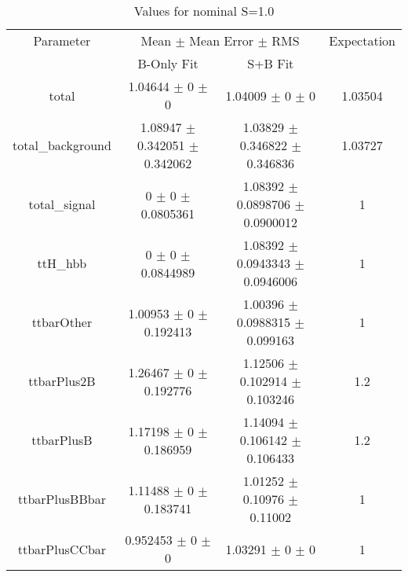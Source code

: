 \begin{table}
\centering
\caption{Values for nominal S=1.0}
\begin{tabular}{cccc}
\toprule
Parameter & \multicolumn{2}{c}{Mean $\pm$ Mean Error $\pm$ RMS} & Expectation\\
 & B-Only Fit & S+B Fit & \\
\midrule
total & \num{1.04644} $\pm$ \num{0} $\pm$ \num{0} & \num{1.04009} $\pm$ \num{0} $\pm$ \num{0} & \num{1.03504}\\
total\_background & \num{1.08947} $\pm$ \num{0.342051} $\pm$ \num{0.342062} & \num{1.03829} $\pm$ \num{0.346822} $\pm$ \num{0.346836} & \num{1.03727}\\
total\_signal & \num{0} $\pm$ \num{0} $\pm$ \num{0.0805361} & \num{1.08392} $\pm$ \num{0.0898706} $\pm$ \num{0.0900012} & \num{1}\\
ttH\_hbb & \num{0} $\pm$ \num{0} $\pm$ \num{0.0844989} & \num{1.08392} $\pm$ \num{0.0943343} $\pm$ \num{0.0946006} & \num{1}\\
ttbarOther & \num{1.00953} $\pm$ \num{0} $\pm$ \num{0.192413} & \num{1.00396} $\pm$ \num{0.0988315} $\pm$ \num{0.099163} & \num{1}\\
ttbarPlus2B & \num{1.26467} $\pm$ \num{0} $\pm$ \num{0.192776} & \num{1.12506} $\pm$ \num{0.102914} $\pm$ \num{0.103246} & \num{1.2}\\
ttbarPlusB & \num{1.17198} $\pm$ \num{0} $\pm$ \num{0.186959} & \num{1.14094} $\pm$ \num{0.106142} $\pm$ \num{0.106433} & \num{1.2}\\
ttbarPlusBBbar & \num{1.11488} $\pm$ \num{0} $\pm$ \num{0.183741} & \num{1.01252} $\pm$ \num{0.10976} $\pm$ \num{0.11002} & \num{1}\\
ttbarPlusCCbar & \num{0.952453} $\pm$ \num{0} $\pm$ \num{0} & \num{1.03291} $\pm$ \num{0} $\pm$ \num{0} & \num{1}\\
\bottomrule
\end{tabular}
\end{table}